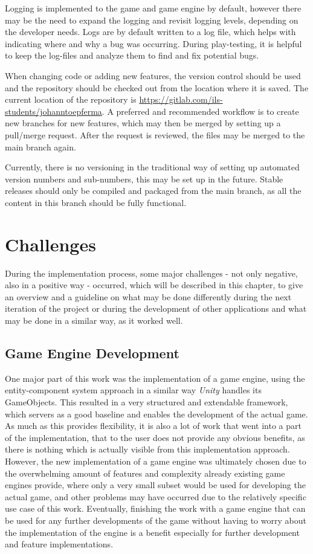 Logging is implemented to the game and game engine by default, however there may be the need to expand the logging
and revisit logging levels, depending on the developer needs.
Logs are by default written to a log file, which helps with indicating where and why a bug was occurring.
During play-testing, it is helpful to keep the log-files and analyze them to find and fix potential bugs.

When changing code or adding new features, the version control should be used and the repository should be checked out from the
location where it is saved.
The current location of the repository is \url{https://gitlab.com/ils-students/johanntoepferma}.
A preferred and recommended workflow is to create new branches for new features, which may then be merged by setting up
a pull/merge request.
After the request is reviewed, the files may be merged to the main branch again.

Currently, there is no versioning in the traditional way of setting up automated version numbers and sub-numbers, this
may be set up in the future.
Stable releases should only be compiled and packaged from the main branch, as all the content in this branch should be
fully functional.
\section{Challenges}\label{sec:challenges}
During the implementation process, some major challenges - not only negative, also in a positive way - occurred, which will be described in this chapter, to give an
overview and a guideline on what may be done differently during the next iteration of the project or during the development of other
applications and what may be done in a similar way, as it worked well.
\subsection{Game Engine Development}\label{subsec:entity-component-system-challenges}
One major part of this work was the implementation of a game engine, using the entity-component system approach in a similar way
\textit{Unity} handles its GameObjects.
This resulted in a very structured and extendable framework, which servers as a good baseline and enables the development of the actual game.
As much as this provides flexibility, it is also a lot of work that went into a part of the implementation, that to the user
does not provide any obvious benefits, as there is nothing which is actually visible from this implementation approach.
However, the new implementation of a game engine was ultimately chosen due to the overwhelming amount of features and complexity
already existing game engines provide, where only a very small subset would be used for developing the actual game, and other problems
may have occurred due to the relatively specific use case of this work.
Eventually, finishing the work with a game engine that can be used for any further developments of the game without having to worry
about the implementation of the engine is a benefit especially for further development and feature implementations.
